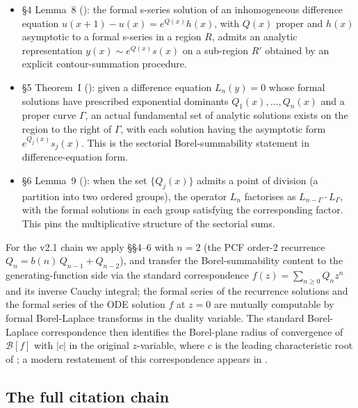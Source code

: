 \documentclass[11pt,reqno]{amsart}
\theoremstyle{plain}
\theoremstyle{definition}
\theoremstyle{remark}
\newcommand{\Borel}{\mathcal{B}}
\begin{document}
\begin{itemize}[leftmargin=2.2em]
\item
\S4 Lemma~8 (\cite[\S4, Lemma~8, p.~30]{birkhoff_trjitzinsky_1933}):
the formal s-series solution of an inhomogeneous difference
equation $u(x+1) - u(x) = e^{Q(x)} h(x)$, with $Q(x)$ proper
and $h(x)$ asymptotic to a formal s-series in a region $R$,
admits an analytic representation $y(x) \sim e^{Q(x)} s(x)$ on
a sub-region $R'$ obtained by an explicit contour-summation
procedure.

\item
\S5 Theorem~I
(\cite[\S5, Thm.~I, p.~41]{birkhoff_trjitzinsky_1933}):
given a difference equation $L_n(y) = 0$ whose formal
solutions have prescribed exponential dominants
$Q_1(x), \ldots, Q_n(x)$ and a proper curve $\Gamma$, an
actual fundamental set of analytic solutions exists on the
region to the right of $\Gamma$, with each solution having
the asymptotic form $e^{Q_j(x)} s_j(x)$. This is the
sectorial Borel-summability statement in difference-equation
form.

\item
\S6 Lemma~9
(\cite[\S6, Lemma~9, p.~48]{birkhoff_trjitzinsky_1933}):
when the set $\{Q_j(x)\}$ admits a point of division (a
partition into two ordered groups), the operator $L_n$
factorises as $L_{n-\Gamma} \cdot L_\Gamma$, with the
formal solutions in each group satisfying the corresponding
factor. This pins the multiplicative structure of the
sectorial sums.
\end{itemize}

For the v2.1 chain we apply \S\S4--6 with $n = 2$ (the
PCF order-2 recurrence $Q_n = b(n)\,Q_{n-1} + Q_{n-2}$),
and transfer the Borel-summability content to the
generating-function side via the standard correspondence
$f(z) = \sum_{n \ge 0} Q_n z^n$ and its inverse Cauchy
integral; the formal series of the recurrence solutions and
the formal series of the ODE solution $f$ at $z = 0$ are
mutually computable by formal Borel-Laplace transforms
in the duality variable. The standard Borel-Laplace
correspondence then identifies the Borel-plane radius of
convergence of $\Borel[f]$ with $|c|$ in the original
$z$-variable, where $c$ is the leading characteristic root
of ; a modern restatement of
this correspondence appears in
\cite[ch.~5, \S5.0a]{costin2008asymptotics}.

\subsection{The full citation chain}
\label{ssec:chain}
\end{document}
